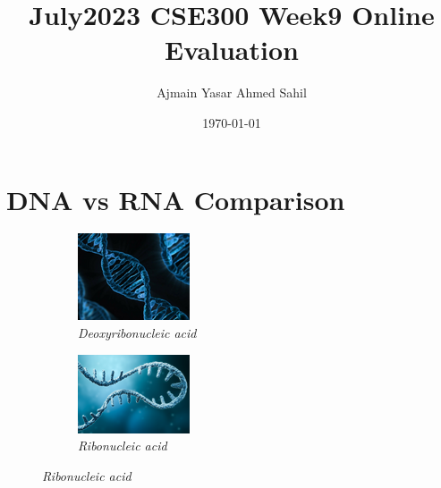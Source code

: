 \documentclass{article}
\title{July2023 CSE300 Week9 Online Evaluation}
\author{Ajmain Yasar Ahmed Sahil}
\date{\today}
\begin{document}
\maketitle
\section*{DNA vs RNA Comparison}
\begin{figure}[htbp]
    \centering
    \begin{subfigure}{0.45\textwidth}
        \centering
        \includegraphics[width=\textwidth]{images/DNA.png}
        \caption{\textit{Deoxyribonucleic acid}}
    \end{subfigure}
    \hfil
    \begin{subfigure}{0.45\textwidth}
        \centering
        \includegraphics[width=\textwidth]{images/RNA.png}
        \caption{\textit{Ribonucleic acid}}
    \end{subfigure}
\end{figure}
\end{document}
